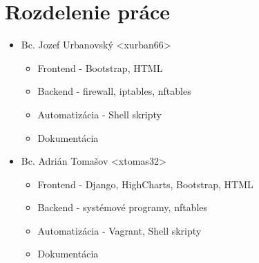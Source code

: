 	\section{Rozdelenie práce}
	
	\begin{itemize}
		\item Bc. Jozef Urbanovský <xurban66>
		\begin{itemize}
			\item Frontend - Bootstrap, HTML
			\item Backend - firewall, iptables, nftables
			\item Automatizácia - Shell skripty
			\item Dokumentácia
		\end{itemize}
	
		\item Bc. Adrián Tomašov <xtomas32>
		\begin{itemize}
			\item Frontend - Django, HighCharts, Bootstrap, HTML
			\item Backend - systémové programy, nftables
			\item Automatizácia - Vagrant, Shell skripty
			\item Dokumentácia
		\end{itemize}
	\end{itemize}
	

